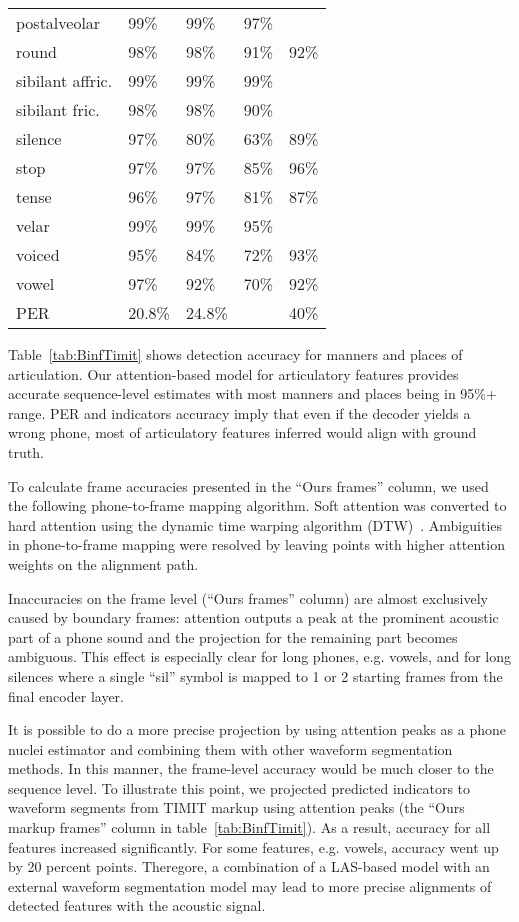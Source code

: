\documentclass[a4paper]{article}
\begin{document}
\begin{table}[th]
\begin{tabular}{llll|l}
postalveolar & 99\% & 99\% & 97\% \\
round & 98\% & 98\% & 91\% & 92\% \\
sibilant affric. & 99\% & 99\% & 99\% \\
sibilant fric. & 98\% & 98\% & 90\% \\
silence & 97\% & 80\% & 63\% & 89\% \\
stop & 97\% & 97\% & 85\% & 96\% \\
tense & 96\% & 97\% & 81\% & 87\% \\
velar & 99\% & 99\% & 95\% \\
voiced & 95\% & 84\% & 72\% & 93\% \\
vowel & 97\% & 92\% & 70\% & 92\% \\
    \midrule
PER & 20.8\% & 24.8\% &  & 40\% \\
    \bottomrule
  \end{tabular}
\end{table}

Table~\ref{tab:BinfTimit} shows detection accuracy for manners and places of articulation.
Our attention-based model for articulatory features provides accurate sequence-level estimates with most manners and places being in 95\%+ range. PER and indicators accuracy imply that even if the decoder yields a wrong phone, most of articulatory features inferred would align with ground truth.

To calculate frame accuracies presented in the ``Ours frames'' column, we used the following phone-to-frame mapping algorithm. Soft attention was converted to hard attention using the dynamic time warping algorithm (DTW)~\cite{Salvador-2007}. Ambiguities in phone-to-frame mapping were resolved by leaving points with higher attention weights on the alignment path.

Inaccuracies on the frame level (``Ours frames'' column) are almost exclusively caused by boundary frames: attention outputs a peak at the prominent acoustic part of a phone sound and the projection for the remaining part becomes ambiguous. This effect is especially clear for long phones, e.g. vowels, and for long silences where a single ``sil'' symbol is mapped to 1 or 2 starting frames from the final encoder layer.

It is possible to do a more precise projection by using attention peaks as a phone nuclei estimator and combining them with other waveform segmentation methods. In this manner, the frame-level accuracy would be much closer to the sequence level. To illustrate this point, we projected predicted indicators to waveform segments from TIMIT markup using attention peaks (the ``Ours markup frames'' column in table~\ref{tab:BinfTimit}). As a result, accuracy for all features increased significantly. For some features, e.g. vowels, accuracy went up by 20 percent points. Theregore, a combination of a LAS-based model with an external waveform segmentation model may lead to more precise alignments of detected features with the acoustic signal.
\end{document}
